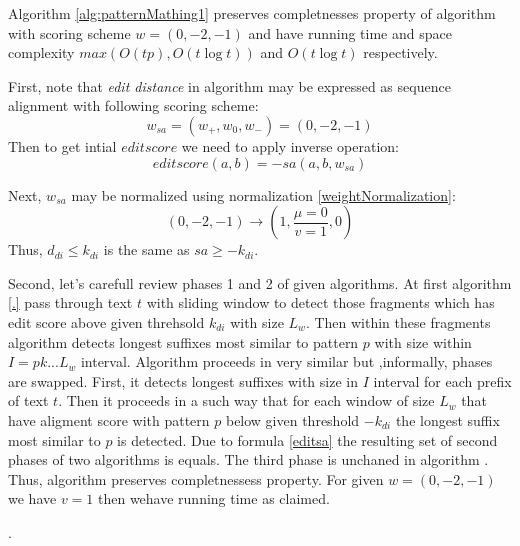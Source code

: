 \begin{theorem}
Algorithm \ref{alg:patternMathing1} preserves completnesses property of algorithm \cite{luciv2019interactive} with scoring scheme  $w = (0,-2,-1)$ and have running time and space complexity $max(O(tp),O(t \log t))$ and $O(t \log t)$  respectively.
\end{theorem}

First, note  that \emph{edit distance} in algorithm \cite{.} may be expressed as sequence alignment  with following scoring scheme: 
\begin{displaymath}
w_{sa}=(w_{+},w_{0},w_{-}) = (0,-2,-1)
\end{displaymath}
Then to get intial $edit score$ we need to apply inverse operation:
\begin{equation}\label{editsa}
editscore(a,b) = -sa(a,b,w_{sa}) 
\end{equation}

Next, $w_{sa}$ may be normalized using normalization \ref{weightNormalization}:
\begin{displaymath}
(0, -2, -1) \rightarrow (1,\frac{\mu=0}{v=1}, 0)
\end{displaymath}
Thus, $d_{di} \leq k_{di}$ is the same as $sa \geq -k_{di}$.

Second, let's carefull review phases 1 and 2 of given algorithms.
At first algorithm \ref{.} pass through text $t$ with sliding window to detect those fragments which has edit score above given threhsold $k_{di}$ with size $L_{w}$.
Then within these fragments algorithm detects longest suffixes most similar to pattern $p$ with size within  $I=pk...L_{w}$ interval.
Algorithm \cite{.} proceeds in very similar but ,informally, phases are swapped.
First, it detects longest suffixes with size in $I$ interval for each prefix of text $t$.
Then it proceeds in a such way that for each window of size $L_{w}$ that have aligment score with pattern $p$ below given threshold $-k_{di}$  the longest suffix most similar to $p$ is detected.
Due to formula  \ref{editsa} the resulting set of second phases of two algorithms is equals.
The third phase is unchaned in algorithm \cite{.}.
Thus, algorithm \cite{}  preserves  completnessess property.
For given $w = (0,-2,-1)$ we have $v=1$ then wehave running time as claimed.


%
 .


